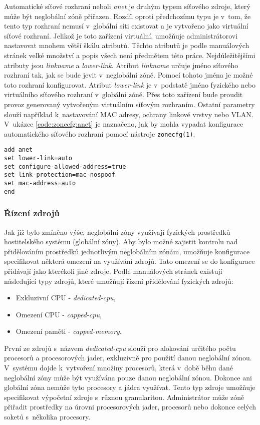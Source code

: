 Automatické síťové rozhraní neboli \textit{anet} je druhým typem síťového zdroje, který může být neglobální zóně přiřazen. Rozdíl
oproti předchozímu typu je v~tom, že tento typ rozhraní nemusí v~globální síti existovat a je vytvořeno jako virtuální síťové
rozhraní. Jelikož je toto zařízení virtuální, umožňuje administrátorovi nastavovat mnohem větší škálu atributů. Těchto
atributů je podle manuálových stránek \cite{oracle:manpages:zonecfg} velké množství a popis všech není předmětem této práce.
Nejdůležitějšími atributy jsou \textit{linkname} a \textit{lower-link}. Atribut \textit{linkname} určuje jméno
síťového rozhraní tak, jak se bude jevit v~neglobální zóně. Pomocí tohoto jména je možné toto rozhraní konfigurovat.
Atribut \textit{lower-link} je v~podstatě jméno fyzického nebo virtuálního síťového rozhraní v~globální zóně.
Přes toto zařízení bude proudit provoz generovaný vytvořeným virtuálním síťovým rozhraním.
Ostatní parametry slouží například k~nastavování MAC adresy, ochrany linkové vrstvy nebo VLAN. V~ukázce 
\ref{code:zonecfg:anet} je naznačeno, jak by mohla vypadat konfigurace automatického síťového rozhraní pomocí nástroje 
\verb|zonecfg(1)|.
\begin{lstlisting}[caption={Konfigurace síťového rozhraní}, float, label={code:zonecfg:anet}]
add anet
set lower-link=auto
set configure-allowed-address=true
set link-protection=mac-nospoof
set mac-address=auto
end
\end{lstlisting}
\subsubsection{Řízení zdrojů}
\label{chapter:zones:configuration:resources:resource_control}
Jak již bylo zmíněno výše, neglobální zóny využívají fyzických prostředků hostitelského systému (globální zóny). Aby bylo
možné zajistit kontrolu nad přidělováním prostředků jednotlivým neglobálním zónám, umožňuje konfigurace specifikovat některá
omezení na využívání zdrojů. Tato omezení se do konfigurace přidávají jako kterékoli jiné zdroje. Podle manuálových stránek
\cite{oracle:manpages:zonecfg} existují následující typy zdrojů, které umožňují řízení přidělování fyzických zdrojů:
\begin{itemize}
 \item Exkluzivní CPU - \textit{dedicated-cpu},
 \item Omezení CPU - \textit{capped-cpu},
 \item Omezení paměti - \textit{capped-memory}.
\end{itemize}
První ze zdrojů s~názvem \textit{dedicated-cpu} slouží pro alokování určitého počtu procesorů a procesorových jader, exkluzivně
pro použití danou neglobální zónou. V~systému dojde k~vytvoření množiny procesorů, která v~době běhu dané neglobální zóny
může být využívána pouze danou neglobální zónou. Dokonce ani globální zóna nemůže tyto procesory a jádra využívat. Tento typ
zdroje umožňuje specifikovat výpočetní zdroje s~různou granularitou. Administrátor může zóně přiřadit prostředky na úrovni 
procesorových jader, procesorů nebo dokonce celých soketů s~několika procesory.

